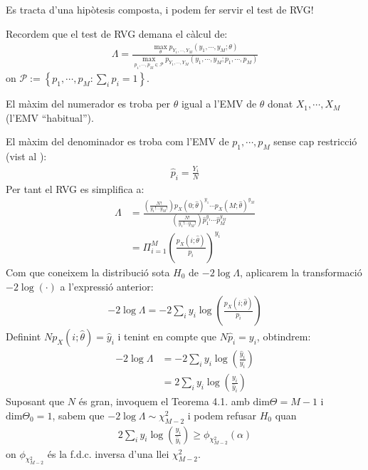 \documentclass[letterpaper,10pt,english]{sphinxmanual}
\begin{document}
Es tracta d’una hipòtesis composta, i podem fer servir el test de RVG!

Recordem que el test de RVG demana el càlcul de:
\begin{equation*}
\begin{split}\Lambda = \frac{\max_{\theta} p_{Y_1, \cdots, Y_M}(y_1, \cdots, y_M; \theta)}{\max_{p_1, \cdots, p_M \in \mathcal{P}} p_{Y_1, \cdots, Y_M}(y_1, \cdots, y_M; p_1, \cdots, p_M)}\end{split}
\end{equation*}
on \(\mathcal{P} := \left\{p_1, \cdots, p_M: \sum_i p_i =1 \right\}\).

El màxim del numerador es troba per \(\theta\) igual a l’EMV de \(\theta\) donat
\(X_1, \cdots, X_M\) (l’EMV “habitual”).

El màxim del denominador es troba com l’EMV de \(p_1, \cdots, p_M\) sense cap restricció
(vist al ):
\begin{equation*}
\begin{split}\hat{p}_i = \frac{Y_i}{N}\end{split}
\end{equation*}
Per tant el RVG es simplifica a:
\begin{equation*}
\begin{split}\Lambda &= \frac{\left( \frac{N!}{y_1! \cdots y_M!} \right) p_X(0;\hat{\theta})^{y_1} \cdots p_X(M;\hat{\theta})^{y_M}}{ \left( \frac{N!}{y_1! \cdots y_M!} \right) \hat{p}_1^{y_1} \cdots \hat{p}_M^{y_M}} \\
&= \Pi_{i=1}^M \left(\frac{p_X(i;\hat{\theta})}{p_i} \right)^{y_i}\end{split}
\end{equation*}
Com que coneixem la distribució sota \(H_0\) de \(-2\log \Lambda\), aplicarem la transformació
\(-2\log(\cdot)\) a l’expressió anterior:
\begin{equation*}
\begin{split}-2 \log\Lambda = -2  \sum_i y_i \log \left(\frac{p_X(i;\hat{\theta})}{p_i} \right)\end{split}
\end{equation*}
Definint \(N p_X(i;\hat{\theta}) = \hat{y}_i\) i tenint en compte que \(N \hat{p}_i = y_i\),
obtindrem:
\begin{equation*}
\begin{split}-2 \log\Lambda & = -2 \sum_i y_i \log \left(\frac{\hat{y}_i}{y_i} \right) \\
&= 2 \sum_i y_i \log \left(\frac{y_i}{\hat{y}_i} \right)\end{split}
\end{equation*}
Suposant que \(N\) és gran, invoquem el Teorema 4.1. amb \(\mbox{dim}\Theta = M-1\) i \(\mbox{dim}\Theta_0 = 1\),
sabem que \(-2 \log\Lambda \sim \chi^2_{M-2}\) i podem refusar \(H_0\) quan
\begin{equation*}
\begin{split}2 \sum_i y_i \log \left(\frac{y_i}{\hat{y}_i} \right) \geq \phi_{\chi^2_{M-2}}(\alpha)\end{split}
\end{equation*}
on \(\phi_{\chi^2_{M-2}}\) és la f.d.c. inversa d’una llei \(\chi^2_{M-2}\).
\end{document}
